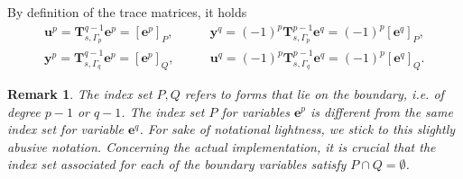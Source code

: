 \documentclass{elsarticle}
\newtheorem{remark}{Remark}
\begin{document}
By definition of the trace matrices, it holds
\begin{equation}\label{eq:inout_PQ}
\begin{aligned}
    \mathbf{u}^p = \mathbf{T}^{q-1}_{s, \Gamma_p}\mathbf{e}^p = [\mathbf{e}^p]_P, \\
    \mathbf{y}^p = \mathbf{T}^{q-1}_{s, \Gamma_q}\mathbf{e}^p = [\mathbf{e}^p]_Q, 
\end{aligned}\qquad 
\begin{aligned}
    \mathbf{y}^q = (-1)^p\mathbf{T}^{p-1}_{s, \Gamma_p}\mathbf{e}^q = (-1)^p[\mathbf{e}^q]_P, \\
    \mathbf{u}^q = (-1)^p\mathbf{T}^{p-1}_{s, \Gamma_q}\mathbf{e}^q = (-1)^p[\mathbf{e}^q]_Q.
\end{aligned}
\end{equation}

\begin{remark}
The index set $P, Q$ refers to forms that lie on the boundary, i.e. of degree $p-1$ or $q-1$. The index set $P$ for variables $\mathbf{e}^p$ is different from the same index set for variable $\mathbf{e}^q$. For sake of notational lightness, we stick to this slightly abusive notation. Concerning the actual implementation, it is crucial that the index set associated for each of the boundary variables satisfy $P\cap Q = \emptyset$. 
\end{remark}
\end{document}
